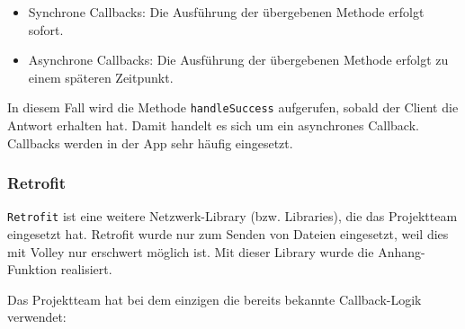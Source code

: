 \begin{itemize}
\tightlist
\item
  Synchrone Callbacks: Die Ausführung der übergebenen Methode erfolgt
  sofort.
\item
  Asynchrone Callbacks: Die Ausführung der übergebenen Methode erfolgt
  zu einem späteren Zeitpunkt.
\end{itemize}

In diesem Fall wird die Methode \texttt{handleSuccess} aufgerufen,
sobald der Client die Antwort erhalten hat. Damit handelt es sich um ein
asynchrones Callback. Callbacks werden in der App sehr häufig
eingesetzt.

\hypertarget{retrofit}{%
\subsubsection{Retrofit}\label{retrofit}}

\texttt{Retrofit} ist eine weitere Netzwerk-Library (bzw. Libraries),
die das Projektteam eingesetzt hat. Retrofit wurde nur zum Senden von
Dateien eingesetzt, weil dies mit Volley nur erschwert möglich ist. Mit
dieser Library wurde die Anhang-Funktion realisiert.

Das Projektteam hat bei dem einzigen die bereits bekannte Callback-Logik
verwendet:

\begin{Shaded}
\begin{Highlighting}[]
\NormalTok{(} \NormalTok{<}\NormalTok{>() \{}
      \NormalTok{<}
        \CommentTok{// }
\NormalTok{    \}}
      
        \CommentTok{// }
\NormalTok{    \}}
\NormalTok{\});}
\end{Highlighting}
\end{Shaded}

